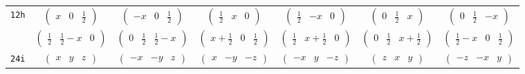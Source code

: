 \documentclass[fleqn,9pt,landscape]{jsarticle}
\begin{document}
\begin{center}
\begin{longtable}{ccccccc}
{\tt 12h} & $ \begin{pmatrix} x & 0 & \frac{1}{2} \end{pmatrix} $ & $ \begin{pmatrix} - x & 0 & \frac{1}{2} \end{pmatrix} $ & $ \begin{pmatrix} \frac{1}{2} & x & 0 \end{pmatrix} $ & $ \begin{pmatrix} \frac{1}{2} & - x & 0 \end{pmatrix} $ & $ \begin{pmatrix} 0 & \frac{1}{2} & x \end{pmatrix} $ & $ \begin{pmatrix} 0 & \frac{1}{2} & - x \end{pmatrix} $ \\
& $ \begin{pmatrix} \frac{1}{2} & \frac{1}{2} - x & 0 \end{pmatrix} $ & $ \begin{pmatrix} 0 & \frac{1}{2} & \frac{1}{2} - x \end{pmatrix} $ & $ \begin{pmatrix} x + \frac{1}{2} & 0 & \frac{1}{2} \end{pmatrix} $ & $ \begin{pmatrix} \frac{1}{2} & x + \frac{1}{2} & 0 \end{pmatrix} $ & $ \begin{pmatrix} 0 & \frac{1}{2} & x + \frac{1}{2} \end{pmatrix} $ & $ \begin{pmatrix} \frac{1}{2} - x & 0 & \frac{1}{2} \end{pmatrix} $ \\ \hline
{\tt 24i} & $ \begin{pmatrix} x & y & z \end{pmatrix} $ & $ \begin{pmatrix} - x & - y & z \end{pmatrix} $ & $ \begin{pmatrix} x & - y & - z \end{pmatrix} $ & $ \begin{pmatrix} - x & y & - z \end{pmatrix} $ & $ \begin{pmatrix} z & x & y \end{pmatrix} $ & $ \begin{pmatrix} - z & - x & y \end{pmatrix} $ \\

\end{longtable}
\end{center}
\end{document}
